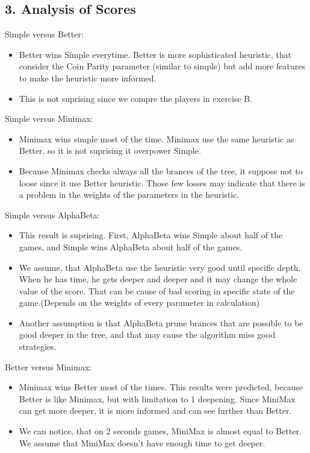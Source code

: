 \documentclass{article}
\begin{document}
\subsection*{3. Analysis of Scores}
Simple versus Better:
\begin{itemize}
\item Better wins Simple everytime. Better is more sophisticated heuristic, that consider the Coin Parity parameter (similar to simple) but add more features to make the heuristic more informed.
\item This is not suprising since we compre the players in exercise B.
\end{itemize}
Simple versus Minimax:
\begin{itemize}
\item Minimax wins simple most of the time. Minimax use the same heuristic as Better, so it is not suprising it overpower Simple.
\item Because Minimax checks always all the brances of the tree, it suppose not to loose since it use Better heuristic. Those few losses may indicate that there is a problem in the weights of the parameters in the heuristic. 
\end{itemize}
Simple versus AlphaBeta:
\begin{itemize}
\item This result is suprising. First, AlphaBeta wins Simple about half of the games, and Simple wins AlphaBeta about half of the games.
\item We assume, that AlphaBeta use the heuristic very good until specific depth. When he has time, he gets deeper and deeper and it may change the whole value of the score. That can be cause of bad scoring in specific state of the game.(Depends on the weights of every parameter in calculation)
\item Another assumption is that AlphaBeta prune brances that are possible to be good deeper in the tree, and that may cause the algorithm miss good strategies.
\end{itemize}
Better versus Minimax:
\begin{itemize}
\item Minimax wins Better most of the times. This results were predicted, because Better is like Minimax, but with limitation to 1 deepening. Since MiniMax can get more deeper, it is more informed and can see further than Better.
\item We can notice, that on 2 seconds games, MiniMax is almost equal to Better. We assume that MiniMax doesn't have enough time   to get deeper.
\end{itemize}
\end{document}
